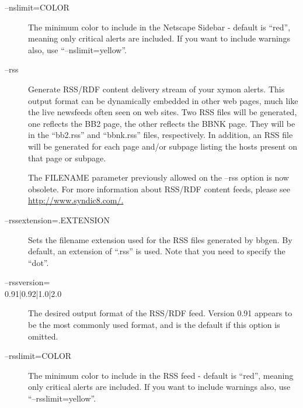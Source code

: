 \begin{description}
 

\item[--nslimit=COLOR] The minimum color to include in the Netscape
  Sidebar - default is ``red'', meaning only critical alerts are
  included. If you want to include warnings also, use
  ``--nslimit=yellow''. 


 

\item[--rss] Generate RSS/RDF content delivery stream of your xymon
  alerts. This output format can be dynamically embedded in other web
  pages, much like the live newsfeeds often seen on web sites. Two RSS
  files will be generated, one reflects the BB2 page, the other
  reflects the BBNK page. They will be in the ``bb2.rss'' and
  ``bbnk.rss'' files, respectively. In addition, an RSS file will be
  generated for each page and/or subpage listing the hosts present on
  that page or subpage.  

 The FILENAME parameter previously allowed on the --rss option is now obsolete.  
 For more information about RSS/RDF content feeds, please see \url{http://www.syndic8.com/.}

 

\item[--rssextension=.EXTENSION] Sets the filename extension used for
  the RSS files generated by bbgen. By default, an extension of
  ``.rss'' is used. Note that you need to specify the ``dot''. 


 

\item[--rssversion=\\{0.91|0.92|1.0|2.0\\}] The desired output format of
  the RSS/RDF feed. Version 0.91 appears to be the most commonly used
  format, and is the default if this option is omitted. 


 

\item[--rsslimit=COLOR] The minimum color to include in the RSS feed -
  default is ``red'', meaning only critical alerts are included. If
  you want to include warnings also, use ``--rsslimit=yellow''. 

\end{description}

